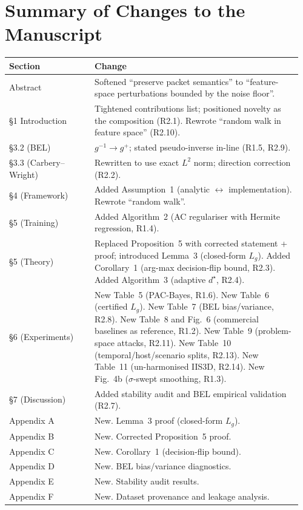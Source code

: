 \documentclass[11pt,letterpaper]{article}
\begin{document}
\section*{Summary of Changes to the Manuscript}
\begin{longtable}{@{}p{0.28\linewidth}p{0.68\linewidth}@{}}
\toprule
\textbf{Section} & \textbf{Change} \\
\midrule
\endhead
Abstract & Softened ``preserve packet semantics'' to ``feature-space perturbations bounded by the noise floor''. \\
\S1 Introduction & Tightened contributions list; positioned novelty as the composition (R2.1). Rewrote ``random walk in feature space'' (R2.10). \\
\S3.2 (BEL) & $g^{-1}\rightarrow g^{+}$; stated pseudo-inverse in-line (R1.5, R2.9). \\
\S3.3 (Carbery--Wright) & Rewritten to use exact $L^2$ norm; direction correction (R2.2). \\
\S4 (Framework) & Added Assumption~1 (analytic $\leftrightarrow$ implementation). Rewrote ``random walk''. \\
\S5 (Training) & Added Algorithm~2 (AC regulariser with Hermite regression, R1.4). \\
\S5 (Theory) & Replaced Proposition~5 with corrected statement + proof; introduced Lemma~3 (closed-form $L_g$). Added Corollary~1 (arg-max decision-flip bound, R2.3). Added Algorithm~3 (adaptive $d^\star$, R2.4). \\
\S6 (Experiments) & New Table~5 (PAC-Bayes, R1.6). New Table~6 (certified $L_g$). New Table~7 (BEL bias/variance, R2.8). New Table~8 and Fig.~6 (commercial baselines as reference, R1.2). New Table~9 (problem-space attacks, R2.11). New Table~10 (temporal/host/scenario splits, R2.13). New Table~11 (un-harmonised IIS3D, R2.14). New Fig.~4b ($\sigma$-swept smoothing, R1.3). \\
\S7 (Discussion) & Added stability audit and BEL empirical validation (R2.7). \\
Appendix A & New. Lemma~3 proof (closed-form $L_g$). \\
Appendix B & New. Corrected Proposition~5 proof. \\
Appendix C & New. Corollary~1 (decision-flip bound). \\
Appendix D & New. BEL bias/variance diagnostics. \\
Appendix E & New. Stability audit results. \\
Appendix F & New. Dataset provenance and leakage analysis. \\
\bottomrule
\end{longtable}
\end{document}
